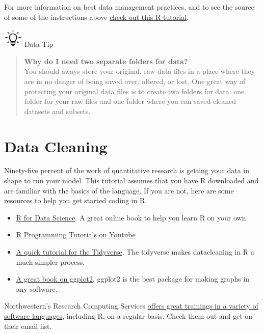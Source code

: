 \documentclass[
]{book}
\providecommand{\tightlist}{%
  \setlength{\itemsep}{0pt}\setlength{\parskip}{0pt}}
\begin{document}
For more information on best data management practices, and to see the source of some of the instructions above \href{https://swcarpentry.github.io/r-novice-gapminder/02-project-intro/index.html}{check out this R tutorial}.

\includegraphics[width=0.36458in,height=\textheight]{images/bulb.png} Data Tip

\begin{quote}
\textbf{Why do I need two separate folders for data?}\\
You should aways store your original, raw data files in a place where they are in no danger of being saved over, altered, or lost. One great way of protecting your original data files is to create two folders for data: one folder for your raw files and one folder where you can saved cleaned datasets and subsets.
\end{quote}

\hypertarget{data-cleaning-1}{%
\section{Data Cleaning}\label{data-cleaning-1}}

Ninety-five percent of the work of quantitative research is getting your data in shape to run your model. This tutorial assumes that you have R downloaded and are familiar with the basics of the language. If you are not, here are some resources to help you get started coding in R.

\begin{itemize}
\tightlist
\item
  \href{https://r4ds.had.co.nz/}{R for Data Science}. A great online book to help you learn R on your own.
\item
  \href{https://www.youtube.com/playlist?list=PL6gx4Cwl9DGCzVMGCPi1kwvABu7eWv08P}{R Programming Tutorials on Youtube}
\item
  \href{https://www.r-bloggers.com/2021/04/tidyverse-in-r-complete-tutorial/}{A quick tutorial for the Tidyverse}. The tidyverse makes datacleaning in R a much simpler process.
\item
  \href{https://ggplot2-book.org/index.html}{A great book on ggplot2}. ggplot2 is the best package for making graphs in any software.
\end{itemize}

Northwestern's Research Computing Services \href{https://www.it.northwestern.edu/research/training.html}{offers great trainings in a variety of software languages}, including R, on a regular basis. Check them out and get on their email list.
\end{document}
